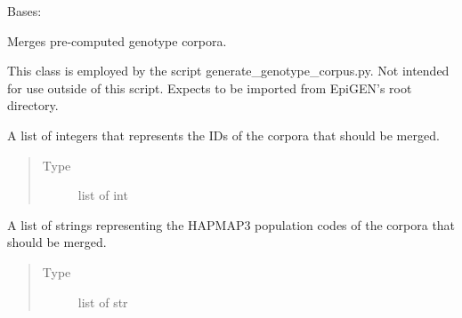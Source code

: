 \documentclass[a4paper,10pt,english]{sphinxhowto}
\begin{document}
\begin{fulllineitems}
\label{\detokenize{utils:utils.genotype_corpus_merger.GenotypeCorpusMerger}}
Bases: 

Merges pre-computed genotype corpora.

This class is employed by the script generate\_genotype\_corpus.py.
Not intended for use outside of this script.
Expects to be imported from EpiGEN’s root directory.

\begin{fulllineitems}
\label{\detokenize{utils:utils.genotype_corpus_merger.GenotypeCorpusMerger.corpus_ids}}
A list of integers that represents the IDs of the corpora that should be merged.
\begin{quote}\begin{description}
\item[{Type}] \leavevmode
list of int

\end{description}\end{quote}

\end{fulllineitems}


\begin{fulllineitems}
\label{\detokenize{utils:utils.genotype_corpus_merger.GenotypeCorpusMerger.pops}}
A list of strings representing the HAPMAP3 population codes of the corpora that should be merged.
\begin{quote}\begin{description}
\item[{Type}] \leavevmode
list of str

\end{description}\end{quote}


\end{fulllineitems}
\end{fulllineitems}
\end{document}
